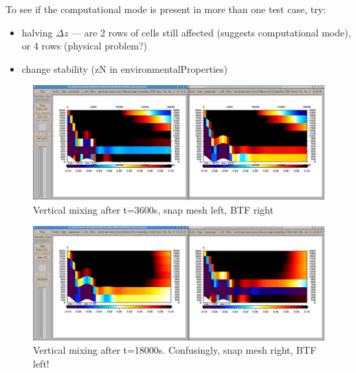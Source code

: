 To see if the computational mode is present in more than one test case, try:
\begin{itemize}
\item halving $\Delta z$ --- are 2 rows of cells still affected (suggests computational mode), or 4 rows (physical problem?)
\item change stability (zN in environmentalProperties)
\end{itemize}

\begin{figure}
\includegraphics[width=\textwidth]{interim-results/gravityWavesBTFsnapMidZoom3600.png}
\caption{Vertical mixing after t=3600s, snap mesh left, BTF right}
\label{fig:gw:mixing-3600s}
\end{figure}

\begin{figure}
\includegraphics[width=\textwidth]{interim-results/gravityWavesBTFsnapMidZoom18000.png}
\caption{Vertical mixing after t=18000s.  Confusingly, snap mesh right, BTF left!}
\label{fig:gw:mixing-18000s}
\end{figure}
